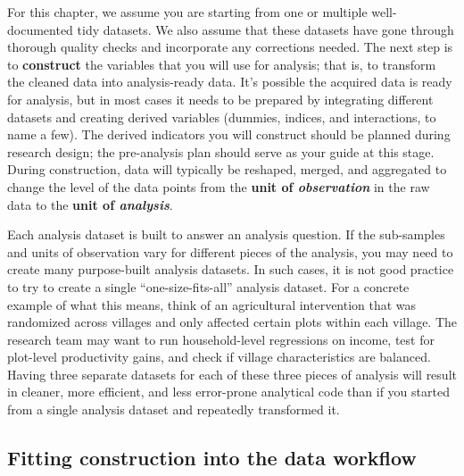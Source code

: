 For this chapter, we assume you are starting from
one or multiple well-documented tidy\cite{hadley2017R} datasets.
We also assume that these datasets
have gone through thorough quality checks
and incorporate any corrections needed.
The next step is to \textbf{construct}
the variables that you will use for analysis;
that is, to transform the cleaned data into analysis-ready data.
It's possible the acquired data is ready for analysis,
but in most cases it needs to be prepared by integrating different datasets
and creating derived variables
(dummies, indices, and interactions, to name a few).
The derived indicators you will construct should be
planned during research design;
the pre-analysis plan should serve as your guide
at this stage.
During construction, data will typically be
reshaped, merged, and aggregated to change the level of the data points
from the \textbf{unit of \textit{observation}} in the raw data
to the \textbf{unit of \textit{analysis}}.

Each analysis dataset is built to answer an analysis question.
If the sub-samples and units of observation
vary for different pieces of the analysis,
you may need to create many purpose-built analysis datasets.
In such cases, it is not good practice
to try to create a single ``one-size-fits-all'' analysis dataset.
For a concrete example of what this means,
think of an agricultural intervention
that was randomized across villages
and only affected certain plots within each village.
The research team may want to
run household-level regressions on income,
test for plot-level productivity gains,
and check if village characteristics are balanced.
Having three separate datasets for each of these three pieces of analysis
will result in cleaner, more efficient, and less error-prone analytical code than if
you started from a single analysis dataset and repeatedly transformed it.

\subsection{Fitting construction into the data workflow}

